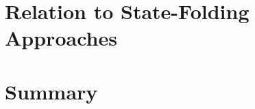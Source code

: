 \section{Relation to State-Folding Approaches}
\label{sec:comp-related}

\section{Summary}
\label{sec:comp-summary}
